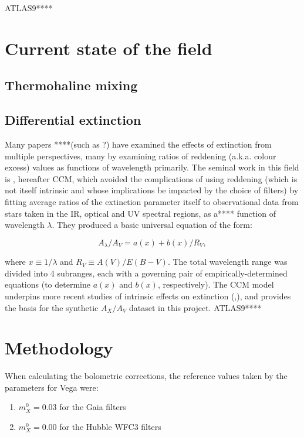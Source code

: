 \documentclass[usenatbib]{mnras}
\begin{document}
ATLAS9****

\section{Current state of the field}
\subsection{Thermohaline mixing}

\subsection{Differential extinction}
Many papers ****(such as ?) have examined the effects of extinction from multiple perspectives, many by examining ratios of reddening (a.k.a. colour excess) values as functions of wavelength primarily. The seminal work in this field is \cite{1989ApJ...345..245C}, hereafter CCM, which avoided the complications of using reddening (which is not itself intrinsic and whose implications be impacted by the choice of filters) by fitting average ratios of the extinction parameter itself to observational data from stars taken in the IR, optical and UV spectral regions, as a**** function of wavelength $\lambda$. They produced a basic universal equation of the form:

\begin{equation}
A_{\lambda}/A_{V} = a(x) + b(x)/R_{V},
\label{CCM_general}
\end{equation}

where $x \equiv 1/\lambda$ and $R_{V} \equiv A(V)/E(B-V)$. The total wavelength range was divided into 4 subranges, each with a governing pair of empirically-determined equations (to determine $a(x)$ and $b(x)$, respectively). The CCM model underpins more recent studies of intrinsic effects on extinction (\citet{2018MNRAS.479L.102C},\citet{2008PASP..120..583G}), and provides the basis for the synthetic  $A_{X}/A_{V}$ dataset in this project. ATLAS9****
\section{Methodology}
When calculating the bolometric corrections, the reference values taken by the parameters for Vega were:
\begin{enumerate}
\item $m_{X}^{0} = 0.03$ for the Gaia filters
\item $m_{X}^{0} = 0.00$ for the Hubble WFC3 filters
\end{enumerate}
\end{document}
